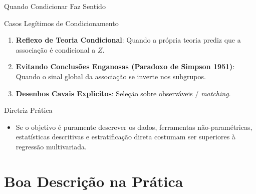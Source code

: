 \documentclass[
  ignorenonframetext,
  aspectratio=169,
  brazilian,
  t,
  10pt]{beamer}
\providecommand{\tightlist}{%
  \setlength{\itemsep}{0pt}\setlength{\parskip}{0pt}}
\begin{document}
\begin{frame}{Quando Condicionar Faz Sentido}
\protect{}\label{quando-condicionar-faz-sentido}
\begin{block}{Casos Legítimos de Condicionamento}
\protect{}\label{casos-leguxedtimos-de-condicionamento}
\begin{enumerate}
\tightlist
\item
  \textbf{Reflexo de Teoria Condicional}: Quando a própria teoria prediz
  que a associação é condicional a \(Z\).
\item
  \textbf{Evitando Conclusões Enganosas (Paradoxo de Simpson 1951)}:
  Quando o sinal global da associação se inverte nos subgrupos.
\item
  \textbf{Desenhos Cavais Explicitos}: Seleção sobre observáveis /
  \emph{matching}.
\end{enumerate}
\end{block}

\begin{block}{Diretriz Prática}
\protect{}\label{diretriz-pruxe1tica}
\begin{itemize}
\tightlist
\item
  Se o objetivo é puramente descrever os dados, ferramentas
  não-paramétricas, estatísticas descritivas e estratificação direta
  costumam ser superiores à regressão multivariada.
\end{itemize}
\end{block}
\end{frame}

\section{Boa Descrição na
Prática}\label{boa-descriuxe7uxe3o-na-pruxe1tica}
\end{document}

